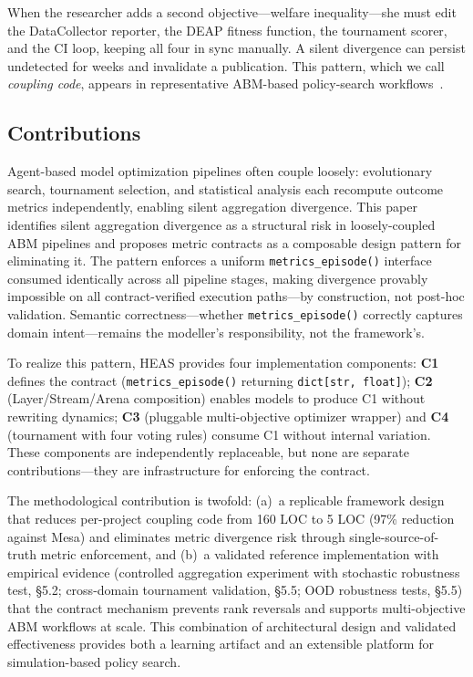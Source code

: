 \documentclass{wscpaperproc}
\begin{document}
When the researcher adds a second objective---welfare inequality---she must edit
the DataCollector reporter, the DEAP fitness function, the tournament scorer, and
the CI loop, keeping all four in sync manually. A silent divergence can persist
undetected for weeks and invalidate a publication. This pattern, which we call
\emph{coupling code}, appears in representative ABM-based policy-search
workflows~\cite{pangallo2019best,capri2023transport}.

\subsection{Contributions}
\label{sec:intro-contributions}

Agent-based model optimization pipelines often couple loosely: evolutionary search,
tournament selection, and statistical analysis each recompute outcome metrics
independently, enabling silent aggregation divergence. This paper identifies silent
aggregation divergence as a structural risk in loosely-coupled ABM pipelines and
proposes metric contracts as a composable design pattern for eliminating it. The
pattern enforces a uniform \texttt{metrics\_episode()} interface consumed identically
across all pipeline stages, making divergence provably impossible on all
contract-verified execution paths---by construction, not post-hoc validation.
Semantic correctness---whether \texttt{metrics\_episode()} correctly captures domain
intent---remains the modeller's responsibility, not the framework's.

To realize this pattern, HEAS provides four implementation components:
\textbf{C1} defines the contract (\texttt{metrics\_episode()} returning
\texttt{dict[str, float]}); \textbf{C2} (Layer/Stream/Arena composition) enables
models to produce C1 without rewriting dynamics; \textbf{C3} (pluggable multi-objective
optimizer wrapper) and \textbf{C4} (tournament with four voting rules) consume C1
without internal variation. These components are independently replaceable, but none
are separate contributions---they are infrastructure for enforcing the contract.

The methodological contribution is twofold: (a)~a replicable framework design that
reduces per-project coupling code from 160 LOC to 5 LOC (97\% reduction against Mesa)
and eliminates metric divergence risk through single-source-of-truth metric enforcement, and (b)~a validated reference
implementation with empirical evidence (controlled aggregation experiment with stochastic robustness test, \S5.2;
cross-domain tournament validation, \S5.5; OOD robustness tests, \S5.5) that the
contract mechanism prevents rank reversals and supports multi-objective ABM workflows
at scale. This combination of architectural design and validated effectiveness provides
both a learning artifact and an extensible platform for simulation-based policy search.
\end{document}
